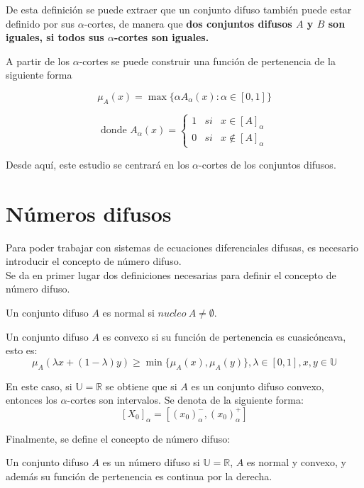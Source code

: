 De esta definición se puede extraer que un conjunto difuso también puede estar definido por sus $\alpha$-cortes, de manera que \textbf{dos conjuntos difusos $A$ y $B$ son iguales, si todos sus $\alpha$-cortes son iguales.} 

A partir de los $\alpha$-cortes se puede construir una función de pertenencia de la siguiente forma \cite{apuntesfuzzy}

\[
\mu_A(x) = \max{\{\alpha A_\alpha(x) : \alpha \in [0, 1]}\}
\]

\[
\text{donde }A_\alpha(x) = \left\{
\begin{array}{ccc}
  1 & si & x \in [A]_\alpha \\
  0 & si & x \notin [A]_\alpha
\end{array}
\right.
\]

Desde aquí, este estudio se centrará en los $\alpha$-cortes de los conjuntos difusos.

\section{Números difusos}
Para poder trabajar con sistemas de ecuaciones diferenciales difusas, es necesario introducir el concepto de número difuso. \\
Se da en primer lugar dos definiciones necesarias para definir el concepto de número difuso.

\begin{definicion}
  \label{def:difuso_normal}
  Un conjunto difuso $A$ es normal si $nucleo ~ A \neq \emptyset$.
\end{definicion}

\begin{definicion}
  \label{def:difuso_convexo}
  Un conjunto difuso $A$ es convexo si su función de pertenencia es cuasicóncava, esto es:
  \[
  \mu_A(\lambda x + (1-\lambda)y) \geq \min{\{\mu_A(x), \mu_A(y)\}}, \lambda \in [0, 1], x, y \in \mathbb{U}
  \]
\end{definicion}

En este caso, si $\mathbb{U}=\mathbb{R}$ se obtiene que si $A$ es un conjunto difuso convexo, entonces los $\alpha$-cortes son intervalos. Se denota de la siguiente forma:
\[
  [X_0]_\alpha = [(x_0)_\alpha^- , (x_0)_\alpha^+]
  \]

  Finalmente, se define el concepto de número difuso:

  \begin{definicion}
    \label{def:numero_difuso}
    Un conjunto difuso $A$ es un número difuso si $\mathbb{U}=\mathbb{R}$, $A$ es normal y convexo, y además su función de pertenencia es continua por la derecha.
  \end{definicion}


